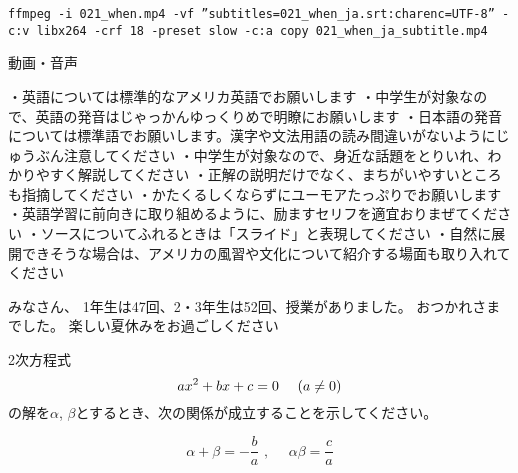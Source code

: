 \documentclass[12pt,jafontscale=0.9247]{jlreq}
\begin{document}
\begin{verbatim}
ffmpeg -i 021_when.mp4 -vf ”subtitles=021_when_ja.srt:charenc=UTF-8” -c:v libx264 -crf 18 -preset slow -c:a copy 021_when_ja_subtitle.mp4
\end{verbatim}
\newpage
動画・音声

・英語については標準的なアメリカ英語でお願いします
・中学生が対象なので、英語の発音はじゃっかんゆっくりめで明瞭にお願いします
・日本語の発音については標準語でお願いします。漢字や文法用語の読み間違いがないようにじゅうぶん注意してください
・中学生が対象なので、身近な話題をとりいれ、わかりやすく解説してください
・正解の説明だけでなく、まちがいやすいところも指摘してください
・かたくるしくならずにユーモアたっぷりでお願いします
・英語学習に前向きに取り組めるように、励ますセリフを適宜おりまぜてください
・ソースについてふれるときは「スライド」と表現してください
・自然に展開できそうな場合は、アメリカの風習や文化について紹介する場面も取り入れてください
\newpage
\vfill

{\gtfamily\bfseries

みなさん、
1年生は47回、2・3年生は52回、授業がありました。
おつかれさまでした。
楽しい夏休みをお過ごしください
}

%


2次方程式
\[
 ax^2+bx+c=0\,\,\,\,\,\,\,\,\text(a\neq{}0\text)
\]
の解を$\alpha$, $\beta$とするとき、次の関係が成立することを示してください。

\begin{tcolorbox}
 \[
 \alpha + \beta = -\frac{b}{a}\,\,,\,\,\,\,\,\,\,\,\alpha\beta = \frac{c}{a}
\]

\end{tcolorbox}
\end{document}
